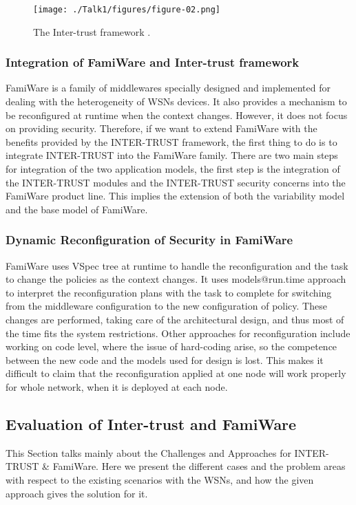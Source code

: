 \documentclass[12pt,a4paper,twoside]{report}
\begin{document}
\begin{figure}[ht]
	\begin{center}
  \texttt{[image: ./Talk1/figures/figure-02.png]}
  \end{center}
  \caption{The Inter-trust framework \cite{ayed;etal:2013}.}
  \label{fig:02}
\end{figure}

\subsubsection{Integration of FamiWare and Inter-trust framework}
FamiWare is a family of middlewares specially designed and implemented for dealing with the heterogeneity of WSNs devices. It also provides a mechanism to be reconfigured at runtime when the context changes. However, it does not focus on providing security. Therefore, if we want to extend FamiWare with the benefits provided by the INTER-TRUST framework, the first thing to do is to integrate INTER-TRUST into the FamiWare family. There are two main steps for integration of the two application models, the first step is the integration of the INTER-TRUST modules and the INTER-TRUST security concerns into the FamiWare product line. This implies the extension of both the variability model and the base model of FamiWare. \par
\subsubsection{Dynamic Reconfiguration of Security in FamiWare}
FamiWare uses VSpec tree at runtime to handle the reconfiguration and the task to change the policies as the context changes. It uses models@run.time \cite{blair;bencomo:2009} approach to interpret the reconfiguration plans with the task to complete for switching from the middleware configuration to the new configuration of policy. These changes are performed, taking care of the architectural design, and thus most of the time fits the system restrictions. Other approaches for reconfiguration include working on code level, where the issue of hard-coding arise, so the competence between the new code and the models used for design is lost. This makes it difficult to claim that the reconfiguration applied at one node will work properly for whole network, when it is deployed at each node.\par

\subsection{Evaluation of Inter-trust and FamiWare}
This Section talks mainly about the Challenges and Approaches for INTER-TRUST \& FamiWare. Here we present the different cases and the problem areas with respect to the existing scenarios with the WSNs, and how the given approach gives the solution for it.
\end{document}
